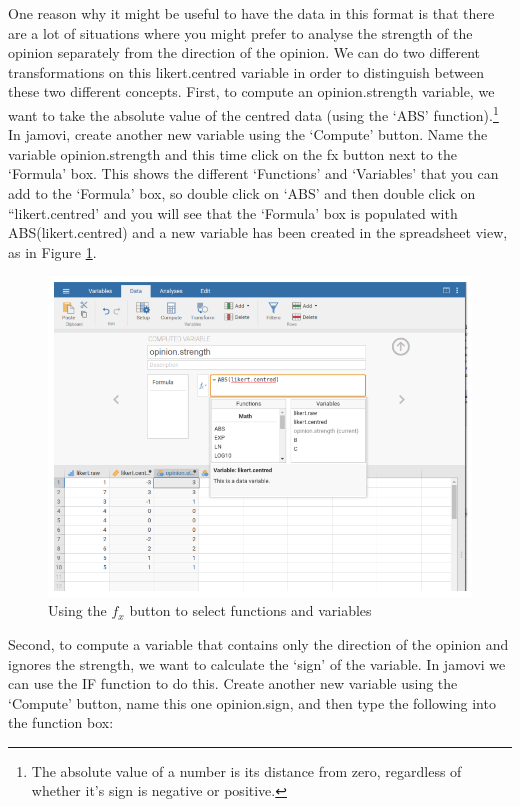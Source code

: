 \documentclass[
]{book}
\begin{document}
One reason why it might be useful to have the data in this format is that there are a lot of situations where you might prefer to analyse the strength of the opinion separately from the direction of the opinion. We can do two different transformations on this likert.centred variable in order to distinguish between these two different concepts. First, to compute an opinion.strength variable, we want to take the absolute value of the centred data (using the `ABS' function).\footnote{The absolute value of a number is its distance from zero, regardless of whether it's sign is negative or positive.} In jamovi, create another new variable using the `Compute' button. Name the variable opinion.strength and this time click on the fx button next to the `Formula' box. This shows the different `Functions' and `Variables' that you can add to the `Formula' box, so double click on `ABS' and then double click on ``likert.centred' and you will see that the `Formula' box is populated with ABS(likert.centred) and a new variable has been created in the spreadsheet view, as in Figure \ref{fig:fig6-5}.

\begin{figure}
\includegraphics[width=0.9\linewidth]{images/Figure6_6} \caption{Using the $f_x$ button to select functions and variables}\label{fig:fig6-5}
\end{figure}

Second, to compute a variable that contains only the direction of the opinion and ignores the strength, we want to calculate the `sign' of the variable. In jamovi we can use the IF function to do this. Create another new variable using the `Compute' button, name this one opinion.sign, and then type the following into the function box:
\end{document}
